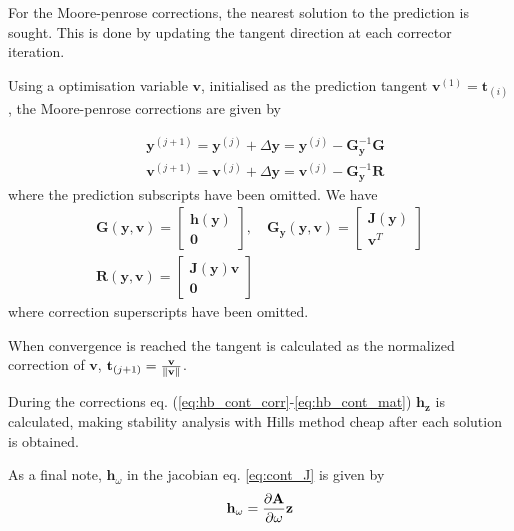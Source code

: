 For the Moore-penrose corrections, the nearest solution to the prediction is
sought. This is done by updating the tangent direction at each corrector
iteration.

Using a optimisation variable $\bm v$, initialised as the prediction tangent
$\bm v^{(1)} = \bm t_{(i)}$, the Moore-penrose corrections are given by

\begin{equation}
  \label{eq:hb_cont_corr}
  \begin{aligned}
    &\bm y^{(j+1)} = \bm y^{(j)} + \Delta \bm y =
    \bm y^{(j)} -\bm G^{-1}_{\bm y} \bm G \\
    &\bm v^{(j+1)} = \bm v^{(j)} + \Delta \bm y =
    \bm v^{(j)} -\bm G^{-1}_{\bm y} \bm R
  \end{aligned}
\end{equation}
where the prediction subscripts have been omitted. We have
\begin{equation}
  \label{eq:hb_cont_mat}
  \begin{gathered}
    \bm G(\bm y, \bm v) =
    \begin{bmatrix}
      \bm h(\bm y) \\ \bm 0
    \end{bmatrix}, \quad
    \bm G_{\bm y}(\bm y, \bm v) =
    \begin{bmatrix}
      \bm J(\bm y) \\ \bm v^T
    \end{bmatrix} \\
      \bm R(\bm y, \bm v) =
  \begin{bmatrix}
    \bm J(\bm y) \bm v \\ \bm 0
  \end{bmatrix}
  \end{gathered}
\end{equation}
where correction superscripts have been omitted.

When convergence is reached the tangent is calculated as the normalized
correction of $\bm v$, $\bm t_{(j+1)} = \frac{\bm v}{\norm{\bm v}}$.

During the corrections eq. (\ref{eq:hb_cont_corr}-\ref{eq:hb_cont_mat}) $\bm h_{\bm
  z}$ is calculated, making stability analysis with Hills method cheap after
each solution is obtained.

As a final note, $\bm h_\omega$ in the jacobian eq. \eqref{eq:cont_J} is given by
\begin{equation}
  \label{eq:hb_cont_Hw}
  \bm h_\omega = \frac{\p \bm A}{\p \omega} \bm z
\end{equation}

